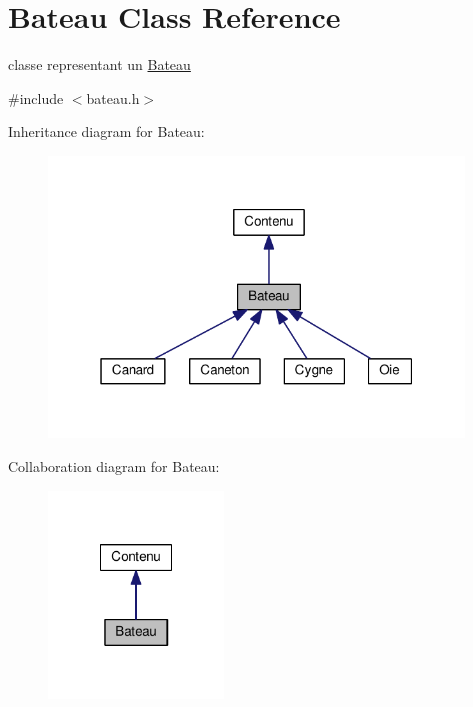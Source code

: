 \hypertarget{classBateau}{\section{Bateau Class Reference}
\label{classBateau}
}


classe representant un \hyperlink{classBateau}{Bateau}  




{\ttfamily \#include $<$bateau.\+h$>$}



Inheritance diagram for Bateau\+:
\nopagebreak
\begin{figure}[H]
\begin{center}
\leavevmode
\includegraphics[width=313pt]{classBateau__inherit__graph}
\end{center}
\end{figure}


Collaboration diagram for Bateau\+:
\nopagebreak
\begin{figure}[H]
\begin{center}
\leavevmode
\includegraphics[width=132pt]{classBateau__coll__graph}
\end{center}
\end{figure}
